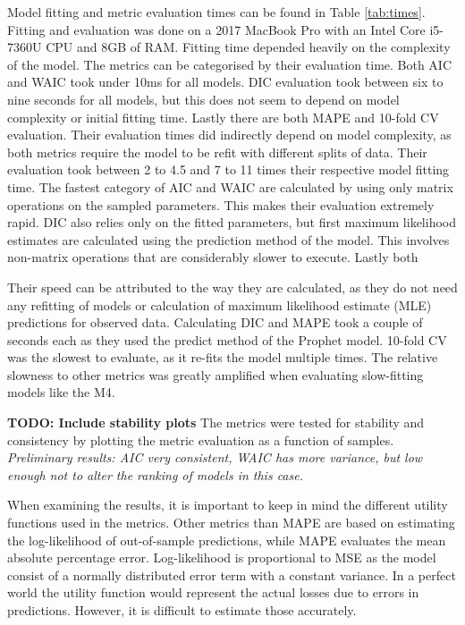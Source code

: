 \documentclass[english, 12pt, a4paper, sci, utf8, a-1b, online]{aaltothesis}
\begin{document}
Model fitting and metric evaluation times can be found in Table \ref{tab:times}. Fitting and evaluation was done on a 2017 MacBook Pro with an Intel Core i5-7360U CPU and 8GB of RAM. Fitting time depended heavily on the complexity of the model. The metrics can be categorised by their evaluation time. Both AIC and WAIC took under 10ms for all models. DIC evaluation took between six to nine seconds for all models, but this does not seem to depend on model complexity or initial fitting time. Lastly there are both MAPE and 10-fold CV evaluation. Their evaluation times did indirectly depend on model complexity, as both metrics require the model to be refit with different splits of data. Their evaluation took between 2 to 4.5 and 7 to 11 times their respective model fitting time. The fastest category of AIC and WAIC are calculated by using only matrix operations on the sampled parameters. This makes their evaluation extremely rapid. DIC also relies only on the fitted parameters, but first maximum likelihood estimates are calculated using the prediction method of the model. This involves non-matrix operations that are considerably slower to execute. Lastly both 

Their speed can be attributed to the way they are calculated, as they do not need any refitting of models or calculation of maximum likelihood estimate (MLE) predictions for observed data. Calculating DIC and MAPE took a couple of seconds each as they used the predict method of the Prophet model. 10-fold CV was the slowest to evaluate, as it re-fits the model multiple times. The relative slowness to other metrics was greatly amplified when evaluating slow-fitting models like the M4.

\textbf{TODO: Include stability plots} The metrics were tested for stability and consistency by plotting the metric evaluation as a function of samples. \textit{Preliminary results: AIC very consistent, WAIC has more variance, but low enough not to alter the ranking of models in this case.}


When examining the results, it is important to keep in mind the different utility functions used in the metrics. Other metrics than MAPE are based on estimating the log-likelihood of out-of-sample predictions, while MAPE evaluates the mean absolute percentage error. Log-likelihood is proportional to MSE as the model consist of a normally distributed error term with a constant variance. In a perfect world the utility function would represent the actual losses due to errors in predictions. However, it is difficult to estimate those accurately. 
\end{document}
